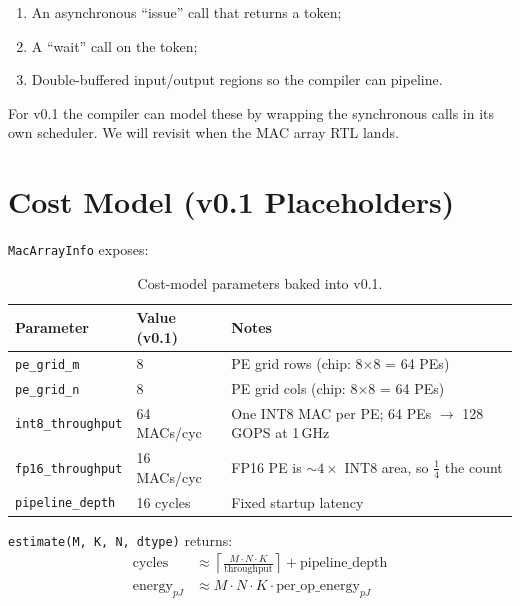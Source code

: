\documentclass[11pt]{article}
\begin{document}
\begin{enumerate}
\item An asynchronous ``issue'' call that returns a token;
\item A ``wait'' call on the token;
\item Double-buffered input/output regions so the compiler can pipeline.
\end{enumerate}

For v0.1 the compiler can model these by wrapping the synchronous
calls in its own scheduler. We will revisit when the MAC array RTL
lands.

\section{Cost Model (v0.1 Placeholders)}
\label{sec:cost}

\texttt{MacArrayInfo} exposes:

\begin{table}[ht]
\centering
\small
\caption{Cost-model parameters baked into v0.1.}
\label{tab:cost}
\begin{tabular}{@{}l l p{8cm}@{}}
\toprule
Parameter                & Value (v0.1) & Notes \\
\midrule
\texttt{pe\_grid\_m}     & 8            & PE grid rows (chip: 8$\times$8 = 64 PEs) \\
\texttt{pe\_grid\_n}     & 8            & PE grid cols (chip: 8$\times$8 = 64 PEs) \\
\texttt{int8\_throughput}& 64 MACs/cyc  & One INT8 MAC per PE; 64 PEs $\to$ 128 GOPS at 1\,GHz \\
\texttt{fp16\_throughput}& 16 MACs/cyc  & FP16 PE is $\sim$$4\times$ INT8 area, so $\frac{1}{4}$ the count \\
\texttt{pipeline\_depth} & 16 cycles    & Fixed startup latency \\
\bottomrule
\end{tabular}
\end{table}

\noindent
\texttt{estimate(M, K, N, dtype)} returns:
\begin{align*}
\text{cycles}     & \approx \left\lceil \frac{M \cdot N \cdot K}{\text{throughput}} \right\rceil + \text{pipeline\_depth} \\
\text{energy}_{pJ} & \approx M \cdot N \cdot K \cdot \text{per\_op\_energy}_{pJ}
\end{align*}
\end{document}
